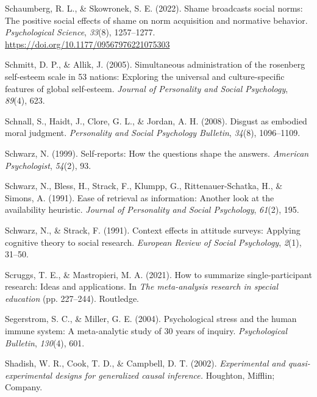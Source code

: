 \documentclass[
]{krantz}
\newlength{\cslhangindent}
\newlength{\cslentryspacingunit} %
\newenvironment{CSLReferences}[2] %
 {%
  \setlength{\parindent}{0pt}
  \ifodd #1
  \let\oldpar\par
  \def\par{\hangindent=\cslhangindent\oldpar}
  \fi
  \setlength{\parskip}{#2\cslentryspacingunit}
 }%
 {}
\begin{document}
\begin{CSLReferences}{1}{0}
\leavevmode{}%
Schaumberg, R. L., \& Skowronek, S. E. (2022). Shame broadcasts social norms: The positive social effects of shame on norm acquisition and normative behavior. \emph{Psychological Science}, \emph{33}(8), 1257--1277. \url{https://doi.org/10.1177/09567976221075303}

\leavevmode{}%
Schmitt, D. P., \& Allik, J. (2005). Simultaneous administration of the rosenberg self-esteem scale in 53 nations: Exploring the universal and culture-specific features of global self-esteem. \emph{Journal of Personality and Social Psychology}, \emph{89}(4), 623.

\leavevmode{}%
Schnall, S., Haidt, J., Clore, G. L., \& Jordan, A. H. (2008). Disgust as embodied moral judgment. \emph{Personality and Social Psychology Bulletin}, \emph{34}(8), 1096--1109.

\leavevmode{}%
Schwarz, N. (1999). Self-reports: How the questions shape the answers. \emph{American Psychologist}, \emph{54}(2), 93.

\leavevmode{}%
Schwarz, N., Bless, H., Strack, F., Klumpp, G., Rittenauer-Schatka, H., \& Simons, A. (1991). Ease of retrieval as information: Another look at the availability heuristic. \emph{Journal of Personality and Social Psychology}, \emph{61}(2), 195.

\leavevmode{}%
Schwarz, N., \& Strack, F. (1991). Context effects in attitude surveys: Applying cognitive theory to social research. \emph{European Review of Social Psychology}, \emph{2}(1), 31--50.

\leavevmode{}%
Scruggs, T. E., \& Mastropieri, M. A. (2021). How to summarize single-participant research: Ideas and applications. In \emph{The meta-analysis research in special education} (pp. 227--244). Routledge.

\leavevmode{}%
Segerstrom, S. C., \& Miller, G. E. (2004). Psychological stress and the human immune system: A meta-analytic study of 30 years of inquiry. \emph{Psychological Bulletin}, \emph{130}(4), 601.

\leavevmode{}%
Shadish, W. R., Cook, T. D., \& Campbell, D. T. (2002). \emph{Experimental and quasi-experimental designs for generalized causal inference.} Houghton, Mifflin; Company.


\end{CSLReferences}
\end{document}
